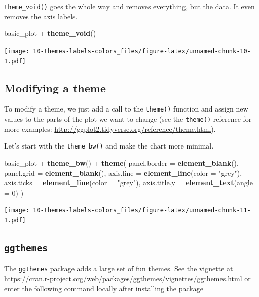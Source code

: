 \documentclass[]{book}
\newenvironment{Shaded}{\begin{snugshade}}{\end{snugshade}}
\newcommand{\KeywordTok}[1]{\textcolor[rgb]{0.13,0.29,0.53}{\textbf{{#1}}}}
\newcommand{\DataTypeTok}[1]{\textcolor[rgb]{0.13,0.29,0.53}{{#1}}}
\newcommand{\DecValTok}[1]{\textcolor[rgb]{0.00,0.00,0.81}{{#1}}}
\newcommand{\StringTok}[1]{\textcolor[rgb]{0.31,0.60,0.02}{{#1}}}
\newcommand{\NormalTok}[1]{{#1}}
\theoremstyle{definition}
\theoremstyle{definition}
\theoremstyle{remark}
\begin{document}
\texttt{theme\_void()} goes the whole way and removes everything, but
the data. It even removes the axis labels.

\begin{Shaded}
\begin{Highlighting}[]
\NormalTok{basic_plot +}\StringTok{ }\KeywordTok{theme_void}\NormalTok{()}
\end{Highlighting}
\end{Shaded}

\texttt{[image: 10-themes-labels-colors\_files/figure-latex/unnamed-chunk-10-1.pdf]}

\subsection{Modifying a theme}\label{modifying-a-theme}

To modify a theme, we just add a call to the \texttt{theme()} function
and assign new values to the parts of the plot we want to change (see
the \texttt{theme()} reference for more examples:
\url{http://ggplot2.tidyverse.org/reference/theme.html}).

Let's start with the \texttt{theme\_bw()} and make the chart more
minimal.

\begin{Shaded}
\begin{Highlighting}[]
\NormalTok{basic_plot +}\StringTok{ }\KeywordTok{theme_bw}\NormalTok{() +}\StringTok{ }\KeywordTok{theme}\NormalTok{(}
  \DataTypeTok{panel.border =} \KeywordTok{element_blank}\NormalTok{(),}
  \DataTypeTok{panel.grid =} \KeywordTok{element_blank}\NormalTok{(),}
  \DataTypeTok{axis.line =} \KeywordTok{element_line}\NormalTok{(}\DataTypeTok{color =} \StringTok{"grey"}\NormalTok{),}
  \DataTypeTok{axis.ticks =} \KeywordTok{element_line}\NormalTok{(}\DataTypeTok{color =} \StringTok{"grey"}\NormalTok{),}
  \DataTypeTok{axis.title.y =} \KeywordTok{element_text}\NormalTok{(}\DataTypeTok{angle =} \DecValTok{0}\NormalTok{)}
\NormalTok{)}
\end{Highlighting}
\end{Shaded}

\texttt{[image: 10-themes-labels-colors\_files/figure-latex/unnamed-chunk-11-1.pdf]}

\subsection{\texorpdfstring{\texttt{ggthemes}}{ggthemes}}\label{ggthemes}

The \texttt{ggthemes} package adds a large set of fun themes. See the
vignette at
\url{https://cran.r-project.org/web/packages/ggthemes/vignettes/ggthemes.html}
or enter the following command locally after installing the package
\end{document}
